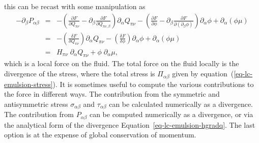 this can be recast with some manipulation as 
\begin{eqnarray}
-\partial_\beta P_{\alpha\beta} &=& -\left( \frac{\partial F}{\partial Q_{\pi\nu}} 
       - \partial_{\beta}\frac{\partial F}{\partial Q_{\pi\nu,\beta}}
 \right) \partial_{\alpha}Q_{\pi\nu}
- \left(\frac{\partial F}{\partial\phi} 
- \partial_{\beta} \frac{\partial F}{\partial \left(\partial_{\beta}\phi\right)}\right)\partial_{\alpha}\phi + \partial_{\alpha}\left(\phi\mu\right)\nonumber\\
&=& -\left(\frac{\delta F}{\delta Q_{\pi\nu}}\right) \partial_{\alpha}Q_{\pi\nu} - \left(\frac{\delta F}{\delta \phi}\right) \partial_{\alpha} \phi + \partial_{\alpha}\left(\phi\mu\right)\nonumber\\ 
&=& H_{\pi\nu}\; \partial_{\alpha} Q_{\pi\nu} + \phi \;\partial_{\alpha}\mu,
\label{eq-lc-emulsion-hgradq}
\end{eqnarray}
which is a local force on the fluid.
The total force on the fluid locally is the divergence of the stress,
where the total stress is $\Pi_{\alpha\beta}$
given by equation~(\ref{eq-lc-emulsion-stress}).
It is sometimes useful to compute the various contributions to the
force in different ways. The contribution from the symmetric and
antisymmetric stress $\sigma_{\alpha\beta}$ and  $\tau_{\alpha\beta}$
can be calculated numerically as a divergence. The contribution from
$P_{\alpha\beta}$ can be computed numerically as a divergence, or via the
analytical form of the divergence Equation~\ref{eq-lc-emulsion-hgradq}.
The  last option is
at the expense of global conservation of momentum.


\vfill
\pagebreak
